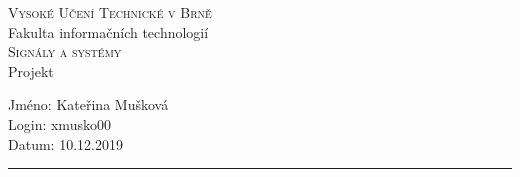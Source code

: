 \documentclass[10pt, a4paper]{article}
\begin{document}
\newcommand{\HRule}{\rule{\linewidth}{0.1mm}}

\begin{center}
	\textsc{\large Vysoké Učení Technické v Brně} \\[0.1cm]
			{\large Fakulta informačních technologií}\\
	\vspace{22px}
	\textsc{\Huge Signály a systémy} \\
	\huge Projekt\\
	\vspace{18px}
\end{center}
\large Jméno: Kateřina Mušková\\
\large Login: xmusko00\\
\large Datum: 10.12.2019\\
\HRule
\end{document}
